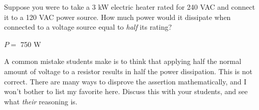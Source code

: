 

Suppose you were to take a 3 kW electric heater rated for 240 VAC and connect it to a 120 VAC power source.  How much power would it dissipate when connected to a voltage source equal to {\it half} its rating?







$P =$ 750 W







A common mistake students make is to think that applying half the normal amount of voltage to a resistor results in half the power dissipation.  This is not correct.  There are many ways to disprove the assertion mathematically, and I won't bother to list my favorite here.  Discuss this with your students, and see what {\it their} reasoning is.





